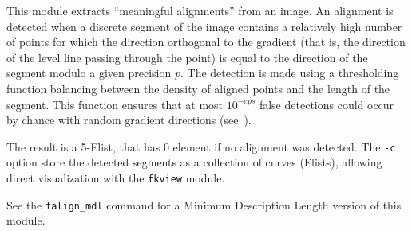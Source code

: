 This module extracts ``meaningful alignments'' 
from an image.
An alignment is detected when a discrete segment of the image
contains a relatively high number of points for which the
direction orthogonal to the gradient (that is, the direction 
of the level line passing through the point) is equal to the direction
of the segment modulo a given precision $p$. The detection is made
using a thresholding function balancing between the density of
aligned points and the length of the segment. This function ensures
that at most $10^{-eps}$ false detections could occur by chance
with random gradient directions (see~\cite{desolneux.moisan.ea:meaningful}).

\medskip

The result is a 5-Flist, that has 0 element if no alignment was detected.
The \verb+-c+ option store the detected segments as a collection of curves
(Flists), allowing direct visualization with the \verb+fkview+ module.

\medskip

See the \verb+falign_mdl+ command for a Minimum Description Length version
of this module.
